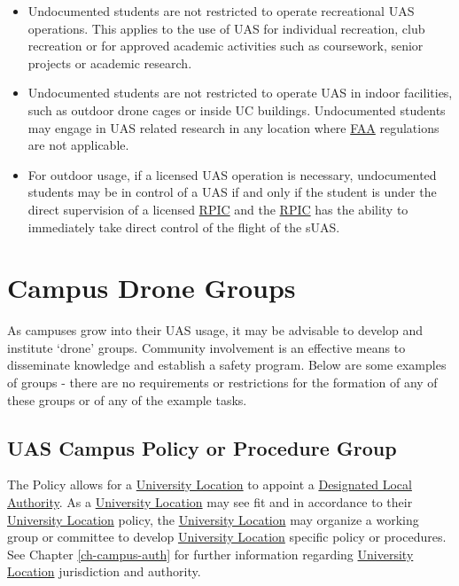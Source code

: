 \documentclass[
]{book}
\providecommand{\tightlist}{%
  \setlength{\itemsep}{0pt}\setlength{\parskip}{0pt}}
\begin{document}
\begin{itemize}
\tightlist
\item
  Undocumented students are not restricted to operate recreational UAS operations. This applies to the use of UAS for individual recreation, club recreation or for approved academic activities such as coursework, senior projects or academic research.
\item
  Undocumented students are not restricted to operate UAS in indoor facilities, such as outdoor drone cages or inside UC buildings. Undocumented students may engage in UAS related research in any location where \protect\hyperlink{FAA}{FAA} regulations are not applicable.
\item
  For outdoor usage, if a licensed UAS operation is necessary, undocumented students may be in control of a UAS if and only if the student is under the direct supervision of a licensed \protect\hyperlink{RPIC}{RPIC} and the \protect\hyperlink{RPIC}{RPIC} has the ability to immediately take direct control of the flight of the sUAS.
\end{itemize}

\hypertarget{ch-campus-groups}{%
\chapter{Campus Drone Groups}\label{ch-campus-groups}}

As campuses grow into their UAS usage, it may be advisable to develop and institute `drone' groups. Community involvement is an effective means to disseminate knowledge and establish a safety program. Below are some examples of groups - there are no requirements or restrictions for the formation of any of these groups or of any of the example tasks.

\hypertarget{uas-campus-policy-or-procedure-group}{%
\section{UAS Campus Policy or Procedure Group}\label{uas-campus-policy-or-procedure-group}}

The Policy allows for a \protect\hyperlink{UL}{University Location} to appoint a \protect\hyperlink{DLA}{Designated Local Authority}. As a \protect\hyperlink{UL}{University Location} may see fit and in accordance to their \protect\hyperlink{UL}{University Location} policy, the \protect\hyperlink{UL}{University Location} may organize a working group or committee to develop \protect\hyperlink{UL}{University Location} specific policy or procedures. See Chapter \ref{ch-campus-auth} for further information regarding \protect\hyperlink{UL}{University Location} jurisdiction and authority.
\end{document}
